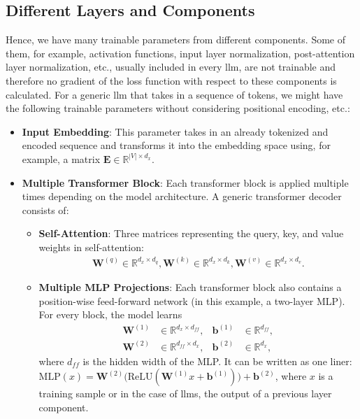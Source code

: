 \subsection{Different Layers and Components}\label{ssec:different_layers_and_components}
Hence, we have many trainable parameters from different components. Some of them, for example, activation functions, input layer normalization, post-attention layer normalization, etc., usually included in every \acrlong{llm}, are not trainable and therefore no gradient of the loss function with respect to these components is calculated. For a generic \acrshort{llm} that takes in a sequence of tokens, we might have the following trainable parameters without considering positional encoding, etc.:
\begin{itemize}
    \item \textbf{Input Embedding}: This parameter takes in an already tokenized and encoded sequence and transforms it into the embedding space using, for example, a matrix $\mathbf{E} \in \mathbb{R}^{|V| \times d_x}$. 
    
    \item \textbf{Multiple Transformer Block}:
    Each transformer block is applied multiple times depending on the model architecture. A generic transformer decoder consists of:
    \begin{itemize}
        \item \textbf{Self-Attention}: Three matrices representing the query, key, and value weights in self-attention:
            \begin{align*}
                  \mathbf{W}^{(q)} \in \mathbb{R}^{d_x \times d_q},  
                  \mathbf{W}^{(k)} \in \mathbb{R}^{d_x \times d_k},  
                  \mathbf{W}^{(v)} \in \mathbb{R}^{d_x \times d_v}.
            \end{align*}\cite{dl4nlp}
        \item \textbf{Multiple MLP Projections}: Each transformer block also contains a position-wise feed-forward network (in this example, a two-layer MLP). For every block, the model learns
            \begin{align*}
              \mathbf{W}^{(1)} &\in \mathbb{R}^{d_x \times d_{ff}}, & \mathbf{b}^{(1)} &\in \mathbb{R}^{d_{ff}},\\
              \mathbf{W}^{(2)} &\in \mathbb{R}^{d_{ff} \times d_x}, & \mathbf{b}^{(2)} &\in \mathbb{R}^{d_x},
            \end{align*}
              where $d_{ff}$ is the hidden width of the MLP. It can be written as one liner: $\text{MLP}(x)=\mathbf{W}^{(2)}\!\bigl(\text{ReLU}(\mathbf{W}^{(1)}x+\mathbf{b}^{(1)})\bigr)+\mathbf{b}^{(2)}$, where $x$ is a training sample or in the case of \acrlong{llm}s, the output of a previous layer component.
    \end{itemize}
    

\end{itemize}
